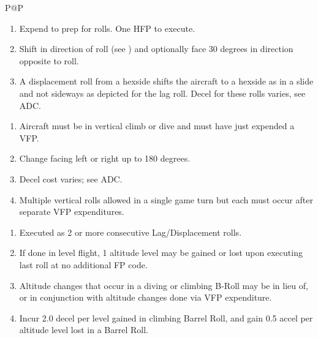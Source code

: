 \begin{twocolumntablefloat}
\begin{twocolumntable}
\begin{tabularx}{\linewidth}{P@{\hspace{1em}}P}

            \begin{enumerate}[nosep]
                \item Expend  to prep for rolls. One HFP to execute.
                \item Shift in direction of roll (see ) and optionally face 30 degrees in direction opposite to roll.
                \item A displacement roll from a hexside shifts the aircraft to a hexside as in a slide and not sideways as depicted for the lag roll. Decel for these rolls varies, see ADC.
            \end{enumerate}


            \begin{enumerate}[nosep]
                \item Aircraft must be in vertical climb or dive and must have just expended a VFP.
                \item Change facing left or right up to 180 degrees.
                \item Decel cost varies; see ADC.
                \item Multiple vertical rolls allowed in a single game turn but each must occur after separate VFP expenditures.
            \end{enumerate}


            \begin{enumerate}[nosep]
                \item Executed as 2 or more consecutive Lag/Displacement rolls.
                \item If done in level flight, 1 altitude level may be gained or lost upon executing last roll at no additional FP code.
                \item Altitude changes that occur in a diving or climbing B-Roll may be in lieu of, or in conjunction with altitude changes done via VFP expenditure.
                \item Incur 2.0 decel per level gained in climbing Barrel Roll, and gain 0.5 accel per altitude level lost in a Barrel Roll.
            \end{enumerate}


\end{tabularx}
\end{twocolumntable}
\end{twocolumntablefloat}
